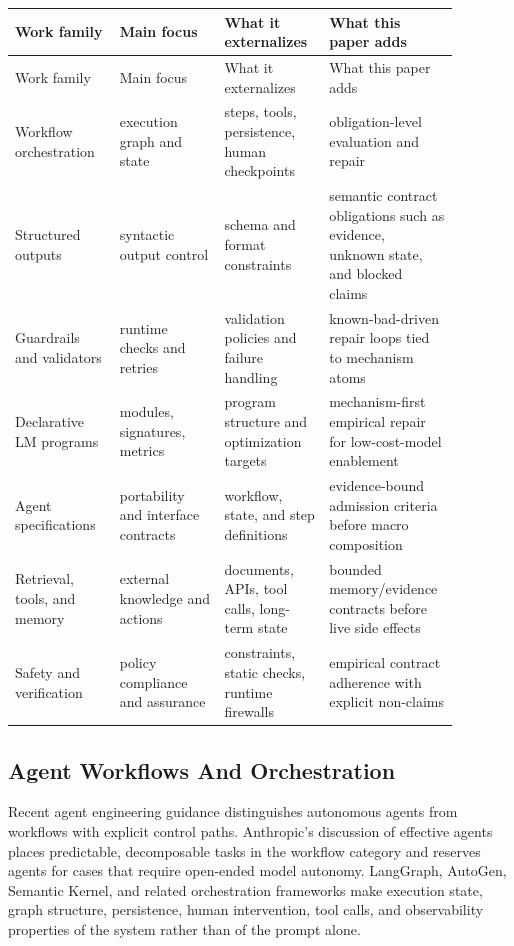 \documentclass[11pt]{article}
\begin{document}
{\small
\setlength{\tabcolsep}{3pt}
\begin{longtable}{>{\raggedright\arraybackslash}p{0.220\linewidth}>{\raggedright\arraybackslash}p{0.220\linewidth}>{\raggedright\arraybackslash}p{0.220\linewidth}>{\raggedright\arraybackslash}p{0.220\linewidth}}
\toprule
Work family & Main focus & What it externalizes & What this paper adds \\
\midrule
\endfirsthead
\toprule
Work family & Main focus & What it externalizes & What this paper adds \\
\midrule
\endhead
Workflow orchestration & execution graph and state & steps, tools, persistence, human checkpoints & obligation-level evaluation and repair \\
Structured outputs & syntactic output control & schema and format constraints & semantic contract obligations such as evidence, unknown state, and blocked claims \\
Guardrails and validators & runtime checks and retries & validation policies and failure handling & known-bad-driven repair loops tied to mechanism atoms \\
Declarative LM programs & modules, signatures, metrics & program structure and optimization targets & mechanism-first empirical repair for low-cost-model enablement \\
Agent specifications & portability and interface contracts & workflow, state, and step definitions & evidence-bound admission criteria before macro composition \\
Retrieval, tools, and memory & external knowledge and actions & documents, APIs, tool calls, long-term state & bounded memory/evidence contracts before live side effects \\
Safety and verification & policy compliance and assurance & constraints, static checks, runtime firewalls & empirical contract adherence with explicit non-claims \\
\bottomrule
\end{longtable}
}

\subsection{Agent Workflows And Orchestration}

Recent agent engineering guidance distinguishes autonomous agents from workflows with explicit control paths. Anthropic's discussion of effective agents places predictable, decomposable tasks in the workflow category and reserves agents for cases that require open-ended model autonomy. LangGraph, AutoGen, Semantic Kernel, and related orchestration frameworks make execution state, graph structure, persistence, human intervention, tool calls, and observability properties of the system rather than of the prompt alone. \cite{P2_EXT_ANTHROPIC,P2_EXT_LANGGRAPH,P2_EXT_AUTOGEN,P2_EXT_SEMANTIC_KERNEL}
\end{document}
